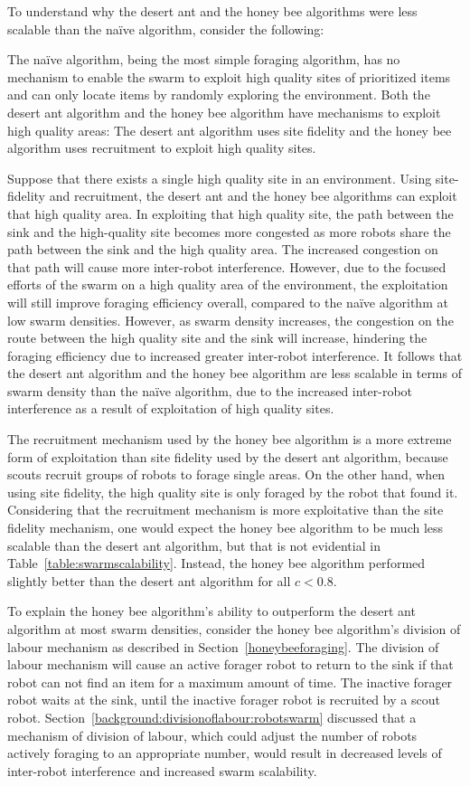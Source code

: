 To understand why the desert ant and the honey bee algorithms were less scalable than the na\"ive algorithm, consider the following:

The na\"ive algorithm, being the most simple foraging algorithm, has no mechanism to enable the swarm to exploit high quality sites of prioritized items and can only locate items by randomly exploring the environment. Both the desert ant algorithm and the honey bee algorithm have mechanisms to exploit high quality areas: The desert ant algorithm uses site fidelity and the honey bee algorithm uses recruitment to exploit high quality sites. 

Suppose that there exists a single high quality site in an environment. Using site-fidelity and recruitment, the desert ant and the honey bee algorithms can exploit that high quality area. In exploiting that high quality site, the path between the sink and the high-quality site becomes more congested as more robots share the path between the sink and the high quality area. The increased congestion on that path will cause more inter-robot interference. However, due to the focused efforts of the swarm on a high quality area of the environment, the exploitation will still improve foraging efficiency overall, compared to the na\"ive algorithm at low swarm densities. However, as swarm density increases, the congestion on the route between the high quality site and the sink will increase, hindering the foraging efficiency due to increased greater inter-robot interference. It follows that the desert ant algorithm and the honey bee algorithm are less scalable in terms of swarm density than the na\"ive algorithm, due to the increased inter-robot interference as a result of exploitation of high quality sites.

The recruitment mechanism used by the honey bee algorithm is a more extreme form of exploitation than site fidelity used by the desert ant algorithm, because scouts recruit groups of robots to forage single areas. On the other hand, when using site fidelity, the high quality site is only foraged by the robot that found it. Considering that the recruitment mechanism is more exploitative than the site fidelity mechanism, one would expect the honey bee algorithm to be much less scalable than the desert ant algorithm, but that is not evidential in Table~\ref{table:swarmscalability}. Instead, the honey bee algorithm performed slightly better than the desert ant algorithm for all $c < 0.8$.

To explain the honey bee algorithm's ability to outperform the desert ant algorithm at most swarm densities, consider the honey bee algorithm's division of labour mechanism as described in Section~\ref{honeybeeforaging}. The division of labour mechanism will cause an active forager robot to return to the sink if that robot can not find an item for a maximum amount of time. The inactive forager robot waits at the sink, until the inactive forager robot is recruited by a scout robot. Section~\ref{background:divisionoflabour:robotswarm} discussed that a mechanism of division of labour, which could adjust the number of robots actively foraging to an appropriate number, would result in decreased levels of inter-robot interference and increased swarm scalability.


